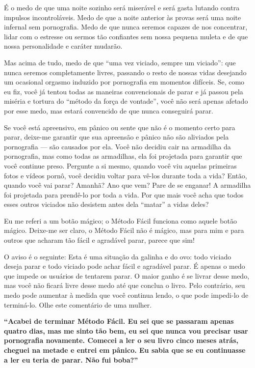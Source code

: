 \documentclass[
  spanish,
  openany]{book}
\begin{document}
É o medo de que uma noite sozinho será miserável e será gasta lutando contra impulsos incontroláveis. Medo de que a noite anterior às provas será uma noite infernal sem pornografia. Medo de que nunca seremos capazes de nos concentrar, lidar com o estresse ou sermos tão confiantes sem nossa pequena muleta e de que nossa personalidade e caráter mudarão.

Mas acima de tudo, medo de que ``uma vez viciado, sempre um viciado'': que nunca seremos completamente livres, passando o resto de nossas vidas desejando um ocasional orgasmo induzido por pornografia em momentos difíceis. Se, como eu fiz, você já tentou todas as maneiras convencionais de parar e já passou pela miséria e tortura do ``método da força de vontade'', você não será apenas afetado por esse medo, mas estará convencido de que nunca conseguirá parar.

Se você está apreensivo, em pânico ou sente que não é o momento certo para parar, deixe-me garantir que sua apreensão e pânico não são aliviados pela pornografia --- são causados por ela. Você não decidiu cair na armadilha da pornografia, mas como todas as armadilhas, ela foi projetada para garantir que você continue preso. Pergunte a si mesmo, quando você viu aquelas primeiras fotos e vídeos pornô, você decidiu voltar para vê-los durante toda a vida? Então, quando você vai parar? Amanhã? Ano que vem? Pare de se enganar! A armadilha foi projetada para prendê-lo por toda a vida. Por que mais você acha que todos esses outros viciados não desistem antes dela ``matar'' a vidas deles?

Eu me referi a um botão mágico; o Método Fácil funciona como aquele botão mágico. Deixe-me ser claro, o Método Fácil não é mágico, mas para mim e para outros que acharam tão fácil e agradável parar, parece que sim!

O aviso é o seguinte: Esta é uma situação da galinha e do ovo: todo viciado deseja parar e todo viciado pode achar fácil e agradável parar. É apenas o medo que impede os usuários de tentarem parar. O maior ganho é se livrar desse medo, mas você não ficará livre desse medo até que conclua o livro. Pelo contrário, seu medo pode aumentar à medida que você continua lendo, o que pode impedi-lo de terminá-lo. Olhe este comentário de uma mulher.

\textbf{``Acabei de terminar Método Fácil. Eu sei que se passaram apenas quatro dias, mas me sinto tão bem, eu sei que nunca vou precisar usar pornografia novamente. Comecei a ler o seu livro cinco meses atrás, cheguei na metade e entrei em pânico. Eu sabia que se eu continuasse a ler eu teria de parar. Não fui boba?''}
\end{document}
